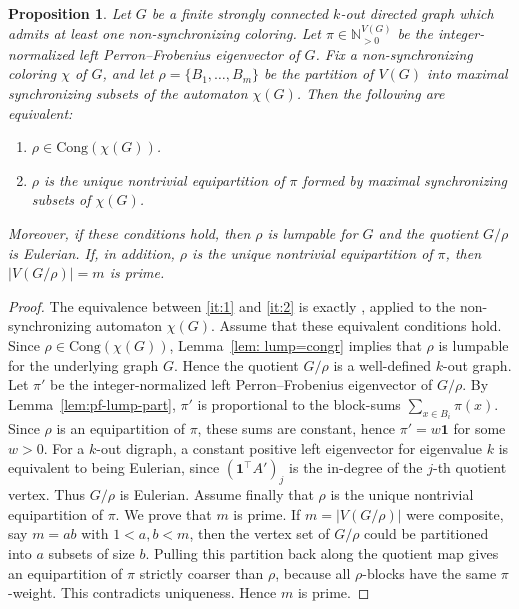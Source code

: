 \documentclass[a4paper,10pt]{amsart}
\theoremstyle{plain}
\newtheorem{proposition}[theorem]{Proposition}
\theoremstyle{definition}
\begin{document}
\begin{proposition}\label{prop:unique-equipartition}
Let $G$ be a finite strongly connected $k$-out directed graph which admits at least one non-synchronizing coloring.
Let $\pi\in\mathbb N^{V(G)}_{>0}$ be the integer-normalized left Perron--Frobenius eigenvector of $G$.
Fix a non-synchronizing coloring $\chi$ of $G$, and let
$\rho=\{B_1,\dots,B_m\}$ be the partition of $V(G)$ into maximal synchronizing subsets of the automaton $\chi(G)$.
Then the following are equivalent:
\begin{enumerate}
\item\label{it:1}
$\rho\in\mathrm{Cong}(\chi(G))$.
\item\label{it:2}
$\rho$ is the unique nontrivial equipartition of $\pi$ formed by maximal synchronizing subsets of $\chi(G)$.
\end{enumerate}
Moreover, if these conditions hold, then $\rho$ is lumpable for $G$ and the quotient $G/\rho$ is Eulerian.
If, in addition, $\rho$ is the unique nontrivial equipartition of $\pi$, then $|V(G/\rho)|=m$ is prime.
\end{proposition}
\begin{proof}
The equivalence between \ref{it:1} and \ref{it:2} is exactly \cite[Lemma~12]{GuPri}, applied to the non-synchronizing automaton $\chi(G)$.
Assume that these equivalent conditions hold. Since $\rho\in\mathrm{Cong}(\chi(G))$, Lemma~\ref{lem: lump=congr} implies that $\rho$ is lumpable for the underlying graph $G$. Hence the quotient $G/\rho$ is a well-defined $k$-out graph.
Let $\pi'$ be the integer-normalized left Perron--Frobenius eigenvector of $G/\rho$. By Lemma~\ref{lem:pf-lump-part}, $\pi'$ is proportional to the block-sums $\sum_{x\in B_i}\pi(x)$. Since $\rho$ is an equipartition of $\pi$, these sums are constant, hence $\pi'=w\mathbf 1$ for some $w>0$. For a $k$-out digraph, a constant positive left eigenvector for eigenvalue $k$ is equivalent to being Eulerian, since $(\mathbf 1^\top A')_j$ is the in-degree of the $j$-th quotient vertex. Thus $G/\rho$ is Eulerian. Assume finally that $\rho$ is the unique nontrivial equipartition of $\pi$. We prove that $m$ is prime. If $m=|V(G/\rho)|$ were composite, say $m=ab$ with $1<a,b<m$, then the vertex set of $G/\rho$ could be partitioned into $a$ subsets of size $b$. Pulling this partition back along the quotient map gives an equipartition of $\pi$ strictly coarser than $\rho$, because all $\rho$-blocks have the same $\pi$-weight. This contradicts uniqueness. Hence $m$ is prime.
\end{proof}
\end{document}

